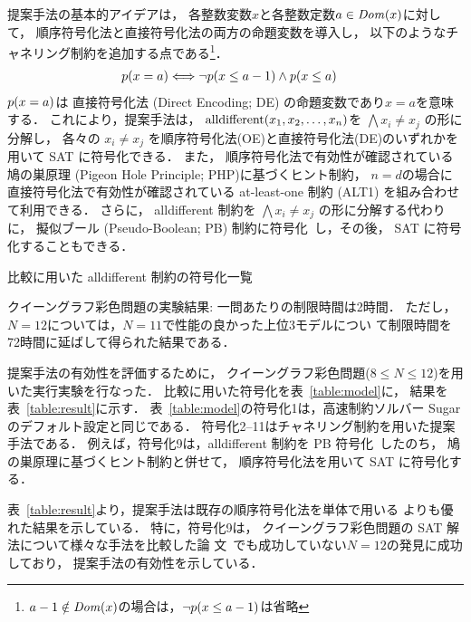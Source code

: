 \documentclass[uplatex,dvipdfmx,a4paper,twocolumn,base=11pt,jbase=11pt,ja=standard]{bxjsarticle}
\begin{document}
提案手法の基本的アイデアは，
各整数変数$x$と各整数定数$a \in {\it Dom}(x)$に対して，
順序符号化法と直接符号化法の両方の命題変数を導入し，
以下のようなチャネリング制約を追加する点である\footnote{%
$a-1\notin{\it Dom}(x)$の場合は，$\lnot p(x\le a-1)$は省略}．
\begin{align*}
  p(x=a) & \Longleftrightarrow \lnot p(x\le a-1) \land p(x\le a)
\end{align*}
$p(x=a)$は
直接符号化法 (Direct Encoding; DE) の命題変数であり$x=a$を意味する．
これにより，提案手法は，
$\textrm{alldifferent}(x_1,x_2,\ldots,x_n)$を $\bigwedge x_i \ne x_j$ の形に分解し，
各々の $x_i \ne x_j$ を順序符号化法(OE)と直接符号化法(DE)のいずれかを
用いて SAT に符号化できる．
また，
順序符号化法で有効性が確認されている鳩の巣原理
(Pigeon Hole Principle; PHP)に基づくヒント制約，
$n=d$の場合に直接符号化法で有効性が確認されている at-least-one 制約 (ALT1)
を組み合わせて利用できる．
さらに，
alldifferent 制約を
$\bigwedge x_i \ne x_j$ の形に分解する代わりに，
擬似ブール (Pseudo-Boolean; PB) 制約に符号化~\cite{Ono19:ai}し，その後，
SAT に符号化することもできる．

\begin{table*}[tb]
  \small
  \renewcommand{\arraystretch}{0.8}
  \centering
  \caption{比較に用いた alldifferent 制約の符号化一覧}
  \label{table:model}
  
\end{table*}
\begin{table*}[t]
  \small
  \renewcommand{\arraystretch}{0.8}
  \centering
  \caption{クイーングラフ彩色問題の実験結果:
    一問あたりの制限時間は2時間．
    ただし，$N=12$については，$N=11$で性能の良かった上位3モデルについ
    て制限時間を72時間に延ばして得られた結果である．}
    \label{table:result}
    
\end{table*}

提案手法の有効性を評価するために，
クイーングラフ彩色問題($8\leq N\leq 12$)を用いた実行実験を行なった．
比較に用いた符号化を表~\ref{table:model}に，
結果を表~\ref{table:result}に示す．
表~\ref{table:model}の符号化1は，高速制約ソルバー
{\sf Sugar}のデフォルト設定と同じである．
符号化2--11はチャネリング制約を用いた提案手法である．
例えば，符号化9は，alldifferent 制約を
PB 符号化~\cite{Ono19:ai}したのち，
鳩の巣原理に基づくヒント制約と併せて，
順序符号化法を用いて SAT に符号化する．

表~\ref{table:result}より，提案手法は既存の順序符号化法を単体で用いる
よりも優れた結果を示している．
特に，符号化9は，
クイーングラフ彩色問題の SAT 解法について様々な手法を比較した論
文~\cite{Tamura:queen}でも成功していない$N=12$の発見に成功しており，
提案手法の有効性を示している．

\small
\end{document}
